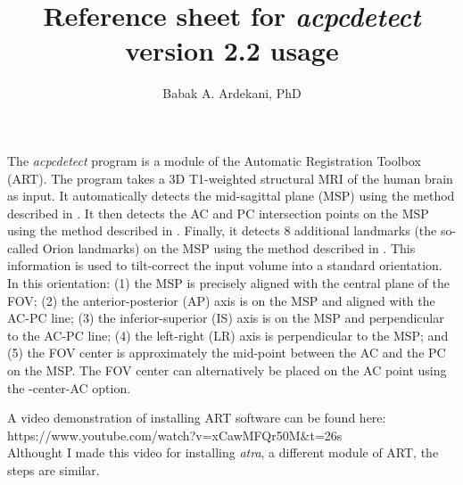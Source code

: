 \documentclass[11pt]{article}
\title{Reference sheet for {\it acpcdetect} version 2.2 usage}
\author{Babak A. Ardekani, PhD}
\begin{document}
\maketitle
{} 
The {\it acpcdetect} program is a module of the Automatic Registration Toolbox (ART). 
The program takes a 3D T1-weighted structural MRI of the human brain as input. 
It automatically detects the mid-sagittal plane (MSP) using the method described in \citep{pmid9533596}.
It then detects the AC and PC intersection points on the MSP using the method described in \citep{pmid19264138}. 
Finally, it detects 8 additional landmarks (the so-called Orion landmarks) on the MSP using the method 
described in \citep{pmid35288224}.  
This information is used to tilt-correct the input volume into a standard orientation.  
In this orientation: (1) the MSP is precisely aligned with the central plane of the FOV; 
(2) the anterior-posterior (AP) axis is on the MSP and aligned with the AC-PC line; 
(3) the inferior-superior (IS) axis is on the MSP and perpendicular to the AC-PC line; 
(4) the left-right (LR) axis is perpendicular to the MSP; and 
(5) the FOV center is approximately the mid-point between the AC and the PC on the MSP. 
The FOV center can alternatively be placed on the AC point using the -center-AC option.  
\vspace{3mm}

A video demonstration of installing ART software can be found here:
https://www.youtube.com/watch?v=xCawMFQr50M\&t=26s \\
Althought I made this video for installing {\it atra}, a different module of ART, the steps are similar.
\end{document}
